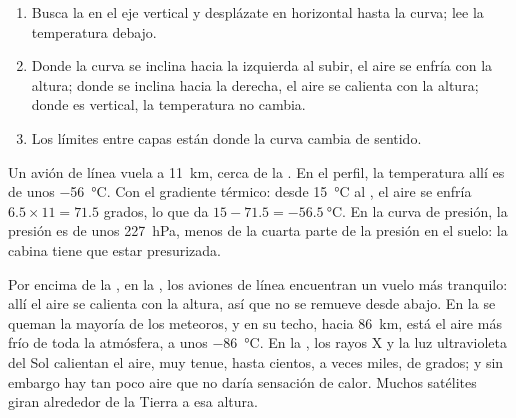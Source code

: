 \begin{method}\label{met:g8:the-atmosphere:profile}
\begin{enumerate}
  \item Busca la  en el eje vertical y desplázate en horizontal
        hasta la curva; lee la temperatura debajo.
  \item Donde la curva se inclina hacia la izquierda al subir, el aire se
        enfría con la altura; donde se inclina hacia la derecha, el aire se
        calienta con la altura; donde es vertical, la temperatura no cambia.
  \item Los límites entre capas están donde la curva cambia de sentido.
\end{enumerate}
\end{method}

\begin{example}\label{ex:g8:the-atmosphere:airliner}
Un avión de línea vuela a \qty{11}{km}, cerca de la . En el
perfil, la temperatura allí es de unos \qty{-56}{\degreeCelsius}. Con el
gradiente térmico: desde \qty{15}{\degreeCelsius} al , el aire
se enfría $6.5 \times 11 = 71.5$ grados, lo que da $15 - 71.5 =
\qty{-56.5}{\degreeCelsius}$. En la curva de presión, la presión es de unos
\qty{227}{hPa}, menos de la cuarta parte de la presión en el suelo: la
cabina tiene que estar presurizada.
\end{example}

Por encima de la , en la , los aviones de línea
encuentran un vuelo más tranquilo: allí el aire se calienta con la altura,
así que no se remueve desde abajo. En la  se queman la mayoría de
los meteoros, y en su techo, hacia \qty{86}{km}, está el aire más frío de
toda la atmósfera, a unos \qty{-86}{\degreeCelsius}. En la , los
rayos X y la luz ultravioleta del Sol calientan el aire, muy tenue, hasta
cientos, a veces miles, de grados; y sin embargo hay tan poco aire que no
daría sensación de calor. Muchos satélites giran alrededor de la Tierra a
esa altura.

